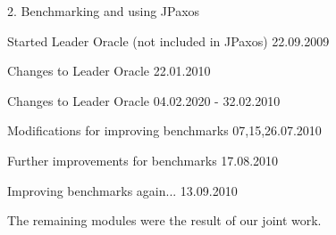 \begin{tightList}
  \item[2. ] Benchmarking and using JPaxos
  \begin{tightList}
    \item[\textbullet] Started Leader Oracle (not included in JPaxos) 22.09.2009
    \item[\textbullet] Changes to Leader Oracle 22.01.2010
    \item[\textbullet] Changes to Leader Oracle 04.02.2020 - 32.02.2010
    \item[\textbullet] Modifications for improving benchmarks 07,15,26.07.2010
    \item[\textbullet] Further improvements for benchmarks 17.08.2010
    \item[\textbullet] Improving benchmarks again... 13.09.2010
  \end{tightList}
\end{tightList}


\noindent The remaining modules were the result of our joint work.

